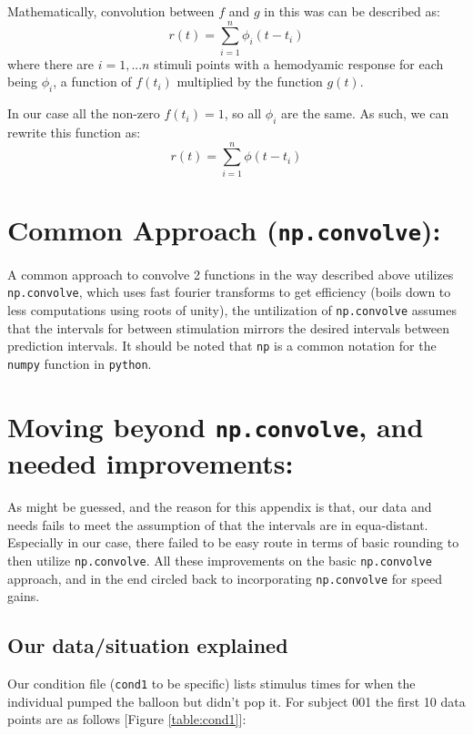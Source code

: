 \documentclass[11pt]{article}
\begin{document}
Mathematically, convolution between $f$ and $g$ in this was can be described as:
\begin{equation}  \label{eq:standard_convolve}
r(t)= \sum_{i=1}^n \phi_{i}(t-t_i)
\end{equation}
where there are $i=1,...n$ stimuli points with a hemodyamic response for each being $\phi_i$, a function of $f(t_i)$ multiplied by the function $g(t)$.

In our case all the non-zero $f(t_i)=1$, so all $\phi_i$ are the same. As such, we can rewrite this function as:
\begin{equation} \label{eq:generalized_hrf}
r(t) =\sum_{i=1}^n \phi (t-t_i)
\end{equation}

\section{Common Approach (\texttt{np.convolve}):}

A common approach to convolve 2 functions in the way described above utilizes \texttt{np.convolve}, which uses fast fourier transforms to get efficiency (boils down to less computations using roots of unity), the untilization of \texttt{np.convolve} assumes that the intervals for between stimulation mirrors the desired intervals between prediction intervals.  It should be noted that \texttt{np} is a common notation for the \texttt{numpy} function in \texttt{python}.

\section{Moving beyond \texttt{np.convolve}, and needed improvements:}

As might be guessed, and the reason for this appendix is that, our data and needs fails to meet the assumption of that the intervals are in equa-distant. Especially in our case, there failed to be easy route in terms of basic rounding to then utilize \texttt{np.convolve}. All these improvements on the basic \texttt{np.convolve} approach, and in the end circled back to incorporating \texttt{np.convolve} for speed gains. 

\subsection{Our data/situation explained}
Our condition file (\texttt{cond1} to be specific) lists stimulus times for when the individual pumped the balloon but didn't pop it. For subject 001 the first 10 data points are as follows [Figure \ref{table:cond1}]:
\end{document}
